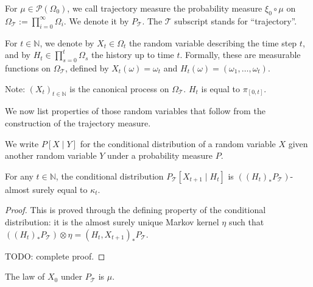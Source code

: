 \begin{definition}\label{def:trajMeasure}
  \leanok
For $\mu \in \mathcal{P}(\Omega_0)$, we call trajectory measure the probability measure $\xi_0 \circ \mu$ on $\Omega_{\mathcal{T}} := \prod_{i=0}^{\infty} \Omega_i$.
We denote it by $P_{\mathcal{T}}$.
The $\mathcal{T}$ subscript stands for ``trajectory''.
\end{definition}


\begin{definition}\label{def:history}
  \leanok %
For $t \in \mathbb{N}$, we denote by $X_t \in \Omega_t$ the random variable describing the time step $t$, and by $H_t \in \prod_{s=0}^t \Omega_s$ the history up to time $t$.
Formally, these are measurable functions on $\Omega_{\mathcal{T}}$, defined by $X_t(\omega) = \omega_t$ and $H_t(\omega) = (\omega_1, \ldots, \omega_t)$.
\end{definition}

Note: $(X_t)_{t \in \mathbb{N}}$ is the canonical process on $\Omega_{\mathcal{T}}$. $H_t$ is equal to $\pi_{[0,t]}$.

We now list properties of those random variables that follow from the construction of the trajectory measure.

We write $P[X \mid Y]$ for the conditional distribution of a random variable $X$ given another random variable $Y$ under a probability measure $P$.

\begin{lemma}\label{lem:condDistrib_X_add_one}
  \leanok
For any $t \in \mathbb{N}$, the conditional distribution $P_{\mathcal{T}}\left[X_{t+1} \mid H_t\right]$ is $((H_t)_* P_{\mathcal{T}})$-almost surely equal to $\kappa_t$.
\end{lemma}

\begin{proof}\leanok
This is proved through the defining property of the conditional distribution: it is the almost surely unique Markov kernel $\eta$ such that $((H_t)_* P_{\mathcal{T}}) \otimes \eta = (H_t, X_{t+1})_*P_{\mathcal{T}}$.

TODO: complete proof.
\end{proof}


\begin{lemma}\label{lem:law_X_zero}
The law of $X_0$ under $P_{\mathcal{T}}$ is $\mu$.
\end{lemma}

